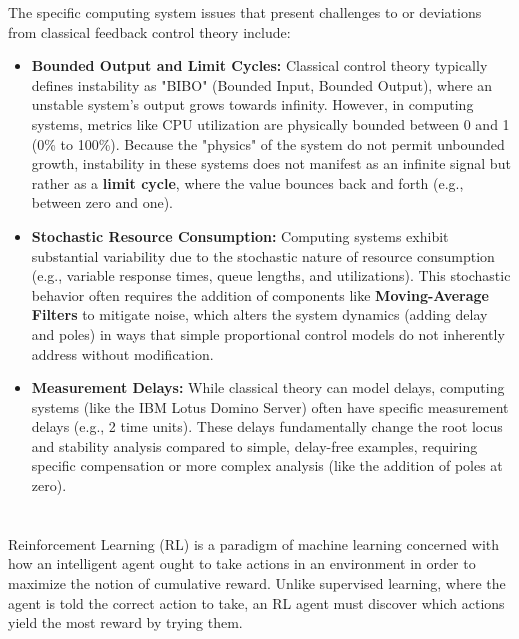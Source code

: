 \documentclass[a4paper,12pt]{article}
\begin{document}
The specific computing system issues that present challenges to or deviations from classical feedback control theory include:

\begin{itemize}
    \item \textbf{Bounded Output and Limit Cycles:}
    Classical control theory typically defines instability as "BIBO" (Bounded Input, Bounded Output), where an unstable system's output grows towards infinity. However, in computing systems, metrics like CPU utilization are physically bounded between 0 and 1 (0\% to 100\%). Because the "physics" of the system do not permit unbounded growth, instability in these systems does not manifest as an infinite signal but rather as a \textbf{limit cycle}, where the value bounces back and forth (e.g., between zero and one).

    \item \textbf{Stochastic Resource Consumption:}
    Computing systems exhibit substantial variability due to the stochastic nature of resource consumption (e.g., variable response times, queue lengths, and utilizations). This stochastic behavior often requires the addition of components like \textbf{Moving-Average Filters} to mitigate noise, which alters the system dynamics (adding delay and poles) in ways that simple proportional control models do not inherently address without modification.

    \item \textbf{Measurement Delays:}
    While classical theory can model delays, computing systems (like the IBM Lotus Domino Server) often have specific measurement delays (e.g., 2 time units). These delays fundamentally change the root locus and stability analysis compared to simple, delay-free examples, requiring specific compensation or more complex analysis (like the addition of poles at zero).
\end{itemize}

\section{}

Reinforcement Learning (RL) is a paradigm of machine learning concerned with how an intelligent agent ought to take actions in an environment in order to maximize the notion of cumulative reward. Unlike supervised learning, where the agent is told the correct action to take, an RL agent must discover which actions yield the most reward by trying them.
\end{document}
